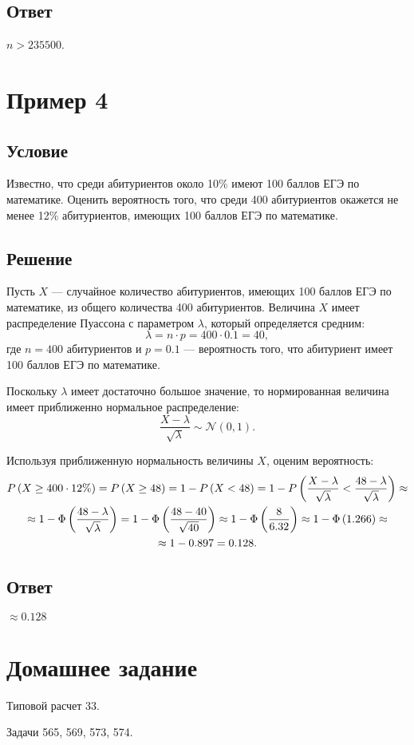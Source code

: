 \documentclass[a4paper,12pt]{article}
\begin{document}
    \subsection*{Ответ}
    $n > 235500$.


    \section{Пример 4}
    \subsection*{Условие}
    Известно, что среди абитуриентов около 10\% имеют 100 баллов ЕГЭ по математике. Оценить вероятность того, что среди 400 абитуриентов окажется не менее 12\%
    абитуриентов, имеющих 100 баллов ЕГЭ по математике.

    \subsection*{Решение}
    Пусть $X$ --- случайное количество абитуриентов, имеющих 100 баллов ЕГЭ по математике, из общего количества 400 абитуриентов. Величина $X$ имеет распределение Пуассона
    с параметром $\lambda$, который определяется средним:
    \begin{equation}
        \lambda = n \cdot p = 400 \cdot 0.1 = 40,
    \end{equation}
    где $n = 400$ абитуриентов и $p = 0.1$ --- вероятность того, что абитуриент имеет 100 баллов ЕГЭ по математике.

    Поскольку $\lambda$ имеет достаточно большое значение, то нормированная величина имеет приближенно нормальное распределение:
    \begin{equation}
        \frac{X - \lambda}{\sqrt{\lambda}} \sim \mathcal{N} \left ( 0, 1 \right ) .
    \end{equation}

    Используя приближенную нормальность величины $X$, оценим вероятность:
    \begin{multline}
        P \left ( X \ge 400 \cdot 12\% \right )
        = P \left ( X \ge 48 \right )
        = 1 - P \left ( X < 48 \right )
        = 1 - P \left ( \frac{X - \lambda}{\sqrt{\lambda}} < \frac{48 - \lambda}{\sqrt{\lambda}} \right ) \approx \\
        \approx 1 - \Phi \left ( \frac{48 - \lambda}{\sqrt{\lambda}} \right )
        = 1 - \Phi \left ( \frac{48 - 40}{\sqrt{40}} \right )
        \approx 1 - \Phi \left ( \frac{8}{6.32} \right )
        \approx 1 - \Phi \left ( 1.266 \right ) \approx \\
        \approx 1 - 0.897
        = 0.128 .
    \end{multline}

    \subsection*{Ответ}
    $\approx 0.128$


    \section{Домашнее задание}
    Типовой расчет 33.

    Задачи 565, 569, 573, 574.
\end{document}
